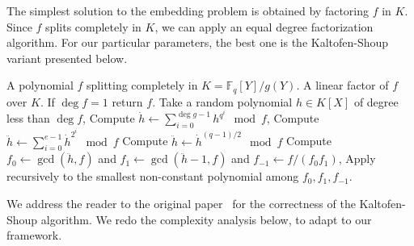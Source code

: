 \documentclass[12pt]{article}
\theoremstyle{plain}
\theoremstyle{definition}
\def\F{\ensuremath{\mathbb{F}}}
\newcounter{algorithm}
\begin{document}
The simplest solution to the embedding problem is obtained by
factoring $f$ in $K$. Since $f$ splits completely in $K$, we can apply
an equal degree factorization algorithm. For our particular
parameters, the best one is the Kaltofen-Shoup variant presented
below.

\begin{algorithm}
  \label{alg:ks}
  \begin{algorithmic}[1]
    \REQUIRE A polynomial $f$ splitting completely in $K=\F_q[Y]/g(Y)$.
    \ENSURE A linear factor of $f$ over $K$.
    \STATE If $\deg f = 1$ return $f$.
    \STATE Take a random polynomial $h\in K[X]$ of degree less than $\deg f$,
    \STATE\label{alg:ks-pseudotrace} Compute $\displaystyle\dot{h} \leftarrow \sum_{i=0}^{\deg g-1} h^{q^i} \mod f$,
    \STATE Compute $\displaystyle\ddot{h} \leftarrow \sum_{i=0}^{e-1} \dot{h}^{2^i}\mod f$
    \ELSE
    \STATE Compute $\ddot{h} \leftarrow \dot{h}^{(q-1)/2}\mod f$
    \ENDIF
    \STATE Compute $f_0\leftarrow\gcd(\ddot{h},f)$ and $f_1\leftarrow\gcd(\ddot{h}-1,f)$ and $f_{-1}\leftarrow f/(f_0f_1)$,
    \STATE Apply recursively to the smallest non-constant polynomial among $f_0,f_1,f_{-1}$.
  \end{algorithmic}
\end{algorithm}

We address the reader to the original paper~\cite{kaltofen+shoup97}
for the correctness of the Kaltofen-Shoup algorithm. We redo the
complexity analysis below, to adapt to our framework.
\end{document}
